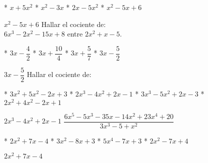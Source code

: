 \begin{enum}
  * $x+5x^2$
  * $x^2-3x$
  * $2x-5x^2$
  * $x^2-5x+6$
\end{enum}
$x^2-5x+6$
Hallar el cociente de: \\
$6x^3-2x^2-15x+8$ entre $2x^2+x-5$.
\begin{enum}
  * $3x-\dfrac{4}{2}$
  * $3x+\dfrac{10}{4}$
  * $3x+\dfrac{5}{7}$
  * $3x-\dfrac{5}{2}$
\end{enum}
$3x-\dfrac{5}{2}$
Hallar el cociente de:
\begin{figure}[h]
\end{figure}
\begin{enum}
  * $3x^2+5x^2-2x+3$
  * $2x^3-4x^2+2x-1$
  * $3x^3-5x^2+2x-3$
  * $2x^2+4x^2-2x+1$
\end{enum}
$2x^3-4x^2+2x-1$
$\dfrac{6x^5-5x^3-35x-14x^2+23x^4+20}{3x^3-5+x^2}$
\begin{enum}
  * $2x^2+7x-4$
  * $3x^2-8x+3$
  * $5x^4-7x+3$
  * $2x^2-7x+4$
\end{enum}
$2x^2+7x-4$
